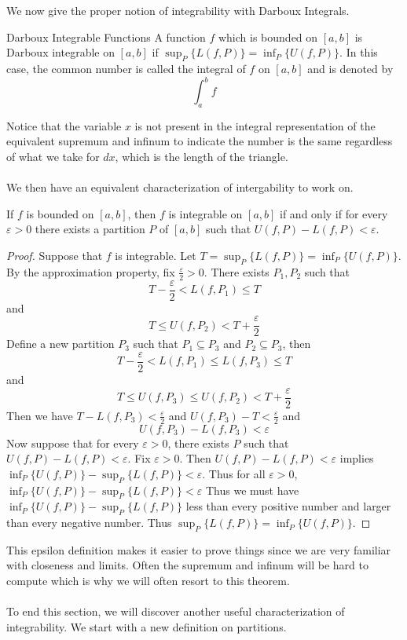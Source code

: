 \documentclass[a4paper]{article}
\begin{document}
We now give the proper notion of integrability with Darboux Integrals. 

\begin{defn}{Darboux Integrable Functions}{} A function $f$ which is bounded on $[a,b]$ is Darboux integrable on $[a,b]$ if $\sup_P\{L(f,P)\}=\inf_P\{U(f,P)\}$. In this case, the common number is called the integral of $f$ on $[a,b]$ and is denoted by $$\int_{a}^{b}f$$
\end{defn}

Notice that the variable $x$ is not present in the integral representation of the equivalent supremum and infinum to indicate the number is the same regardless of what we take for $dx$, which is the length of the triangle. \\~\\
We then have an equivalent characterization of intergability to work on. 

\begin{thm}{}{} If $f$ is bounded on $[a,b]$, then $f$ is integrable on $[a,b]$ if and only if for every $\varepsilon>0$ there exists a partition $P$ of $[a,b]$ such that $U(f,P)-L(f,P)<\varepsilon$. \tcbline
\begin{proof} Suppose that $f$ is integrable. Let $T=\sup_P\{L(f,P)\}=\inf_P\{U(f,P)\}$. By the approximation property, fix $\frac{\varepsilon}{2}>0$. There exists $P_1,P_2$ such that $$T-\frac{\varepsilon}{2}<L(f,P_1)\leq T$$ and $$T\leq U(f,P_2)<T+\frac{\varepsilon}{2}$$ Define a new partition $P_3$ such that $P_1\subseteq P_3$ and $P_2\subseteq P_3$, then $$T-\frac{\varepsilon}{2}<L(f,P_1)\leq L(f,P_3)\leq T$$ and $$T\leq U(f,P_3)\leq U(f,P_2)<T+\frac{\varepsilon}{2}$$ Then we have $T-L(f,P_3)<\frac{\varepsilon}{2}$ and $U(f,P_3)-T<\frac{\varepsilon}{2}$ and $$U(f,P_3)-L(f,P_3)<\varepsilon$$
Now suppose that for every $\varepsilon>0$, there exists $P$ such that $U(f,P)-L(f,P)<\varepsilon$. Fix $\varepsilon>0$. Then $U(f,P)-L(f,P)<\varepsilon$ implies $\inf_P\{U(f,P)\}-\sup_P\{L(f,P)\}<\varepsilon$. Thus for all $\varepsilon>0$, $\inf_P\{U(f,P)\}-\sup_P\{L(f,P)\}<\varepsilon$ Thus we must have $\inf_P\{U(f,P)\}-\sup_P\{L(f,P)\}$ less than every positive number and larger than every negative number. Thus $\sup_P\{L(f,P)\}=\inf_P\{U(f,P)\}$. 
\end{proof}
\end{thm}

This epsilon definition makes it easier to prove things since we are very familiar with closeness and limits. Often the supremum and infinum will be hard to compute which is why we will often resort to this theorem. \\~\\
To end this section, we will discover another useful characterization of integrability. We start with a new definition on partitions. 
\end{document}
